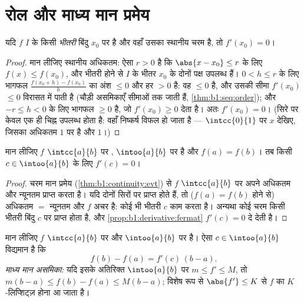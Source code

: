 \section{रोल और माध्य मान प्रमेय}

\begin{proposition}[भीतरी चरम]\label{prop:b1:derivative:fermat}
यदि $f$ $I$ के किसी \emph{भीतरी} बिंदु $x_0$ पर  है और वहाँ उसका
स्थानीय चरम है, तो $f'(x_0) = 0$।
\end{proposition}

\begin{proof}
मान लीजिए स्थानीय अधिकतम: ऐसा $r > 0$ है कि $\abs{x - x_0} \leq r$ के लिए
$f(x) \leq f(x_0)$, और भीतरी होने से $I$ के भीतर $x_0$ के दोनों पक्ष उपलब्ध
हैं। $0 < h \leq r$ के लिए भागफल $\frac{f(x_0 + h) - f(x_0)}{h}$ का अंश
$\leq 0$ और हर $> 0$ है: वह $\leq 0$ है, और उसकी सीमा $f'(x_0)$ $\leq 0$
विरासत में पाती है (चौड़ी असमिकाएँ सीमाओं तक जाती हैं,
\cref{thm:b1:seq:order}); और $-r \leq h < 0$ के लिए भागफल $\geq 0$ है, जो
$f'(x_0) \geq 0$ देता है। अतः $f'(x_0) = 0$। (सिरे पर केवल एक ही चिह्न
उपलब्ध होता है: वहाँ निष्कर्ष विफल हो जाता है --- $\intcc{0}{1}$ पर $x$
देखिए, जिसका अधिकतम $1$ पर है और  $1$।)
\end{proof}

\begin{theorem}[रोल]\label{thm:b1:derivative:rolle}
मान लीजिए $f$ $\intcc{a}{b}$ पर , $\intoo{a}{b}$ पर  है और $f(a)
= f(b)$। तब किसी $c \in \intoo{a}{b}$ के लिए $f'(c) = 0$।
\end{theorem}

\begin{proof}
चरम मान प्रमेय (\cref{thm:b1:continuity:evt}) से $f$ $\intcc{a}{b}$ पर अपने
अधिकतम और न्यूनतम प्राप्त करता है। यदि दोनों सिरों पर प्राप्त होते हैं, तो
($f(a) = f(b)$ होने से) अधिकतम $=$ न्यूनतम और $f$ अचर है: कोई भी भीतरी $c$
काम करता है। अन्यथा कोई चरम किसी भीतरी बिंदु $c$ पर प्राप्त होता है, और
\cref{prop:b1:derivative:fermat} $f'(c) = 0$ दे देती है।
\end{proof}

\begin{theorem}[माध्य मान प्रमेय]\label{thm:b1:derivative:mvt}
मान लीजिए $f$ $\intcc{a}{b}$ पर  और $\intoo{a}{b}$ पर  है। ऐसा $c
\in \intoo{a}{b}$ विद्यमान है कि
\[
f(b) - f(a) = f'(c)\,(b - a) .
\]
\emph{माध्य मान असमिका:} यदि इसके अतिरिक्त $\intoo{a}{b}$ पर $m \leq f' \leq
M$, तो $m(b-a) \leq f(b) - f(a) \leq M(b-a)$; विशेष रूप से $\abs{f'} \leq K$
से $f$ का $K$-लिप्शिट्ज़ होना आ जाता है।
\end{theorem}

